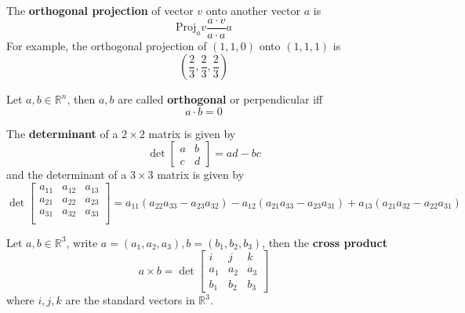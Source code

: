 \documentclass[openany]{book}
\newcommand{\R}{\mathbb{R}}
\begin{document}
\begin{defn}
    The \textbf{orthogonal projection} of vector $v$ onto another vector $a$ is
    \begin{equation*}
        \text{Proj}_av\frac{a\cdot v}{a\cdot a}a
    \end{equation*}
    For example, the orthogonal projection of $(1,1,0)$ onto $(1,1,1)$ is 
    \begin{equation*}
        \left(\frac{2}{3}, \frac{2}{3},\frac{2}{3}\right)
    \end{equation*}
\end{defn}


\begin{defn}[orthogonal]
    Let $a,b\in\R^n$, then $a,b$ are called \textbf{orthogonal} or perpendicular iff 
    \begin{equation*}
        a\cdot b=0
    \end{equation*}
\end{defn}


\begin{defn}[determinant]
    The \textbf{determinant} of a $2\times 2$ matrix is given by 
    \begin{equation*}
        \det\begin{bmatrix}
            a&b\\
            c&d
        \end{bmatrix}=ad-bc
    \end{equation*}
    and the determinant of a $3\times 3$ matrix is given by 
    \begin{equation*}
        \det\begin{bmatrix}
            a_{11}&a_{12}&a_{13}\\
            a_{21}&a_{22}&a_{23}\\
            a_{31}&a_{32}&a_{33}\\
        \end{bmatrix}=a_{11}(a_{22}a_{33}-a_{23}a_{32})-a_{12}(a_{21}a_{33}-a_{23}a_{31})+a_{13}(a_{21}a_{32}-a_{22}a_{31})
    \end{equation*}
\end{defn}



\begin{defn}
    Let $a,b\in\R^3$, write $a=(a_1,a_2,a_3), b=(b_1,b_2,b_3)$, then the \textbf{cross product}
    \begin{equation*}
        a\times b=\det\begin{bmatrix}
            i&j&k\\
            a_1&a_2&a_3\\
            b_1&b_2&b_3
        \end{bmatrix}
    \end{equation*}
    where $i,j,k$ are the standard vectors in $\R^3$.
\end{defn}
\end{document}
